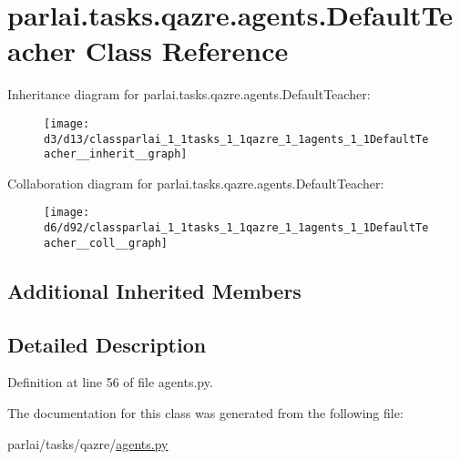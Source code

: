 \hypertarget{classparlai_1_1tasks_1_1qazre_1_1agents_1_1DefaultTeacher}{}\section{parlai.\+tasks.\+qazre.\+agents.\+Default\+Teacher Class Reference}
\label{classparlai_1_1tasks_1_1qazre_1_1agents_1_1DefaultTeacher}


Inheritance diagram for parlai.\+tasks.\+qazre.\+agents.\+Default\+Teacher\+:
\nopagebreak
\begin{figure}[H]
\begin{center}
\leavevmode
\texttt{[image: d3/d13/classparlai\_1\_1tasks\_1\_1qazre\_1\_1agents\_1\_1DefaultTeacher\_\_inherit\_\_graph]}
\end{center}
\end{figure}


Collaboration diagram for parlai.\+tasks.\+qazre.\+agents.\+Default\+Teacher\+:
\nopagebreak
\begin{figure}[H]
\begin{center}
\leavevmode
\texttt{[image: d6/d92/classparlai\_1\_1tasks\_1\_1qazre\_1\_1agents\_1\_1DefaultTeacher\_\_coll\_\_graph]}
\end{center}
\end{figure}
\subsection*{Additional Inherited Members}


\subsection{Detailed Description}


Definition at line 56 of file agents.\+py.



The documentation for this class was generated from the following file\+:\begin{DoxyCompactItemize}
\item 
parlai/tasks/qazre/\hyperlink{parlai_2tasks_2qazre_2agents_8py}{agents.\+py}\end{DoxyCompactItemize}
